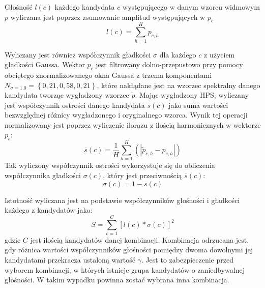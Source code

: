 \documentclass[12pt,a4paper,twoside]{mwart}
\begin{document}
Głośność $l(c)$ każdego kandydata $c$ występującego w danym wzorcu widmowym $p$ wyliczana jest poprzez zsumowanie amplitud występujących w $p_c$
\begin{equation}\label{eq:inharmonicity:loudness}
  l(c) = \sum_{h=1}^H p_{c,h}
\end{equation}

Wyliczany jest również współczynnik gładkości $\sigma$ dla każdego $c$ z użyciem gładkości Gaussa. Wektor $p_c$ jest filtrowany dolno-przepustowo przy pomocy obciętego znormalizowanego okna Gaussa z trzema komponentami $N_{\sigma = 1.0} = \left\{0,21, 0,58, 0,21\right\}$, które nakłądane jest na wzorzec spektralny danego kandydata tworząc wygładzony wzorzec $\widetilde{p}$. Mając wygładzony HPS, wyliczany jest współczynnik ostrości danego kandydata $s(c)$ jako suma wartości bezwzględnej różnicy wygładzonego i oryginalnego wzorca. Wynik tej operacji normalizowany jest poprzez wyliczenie ilorazu z ilością harmonicznych w wektorze $p_c$:
\begin{equation}\label{eq:inharmonicity:sharpness}
  \overline{s}(c) = \frac{1}{H}\sum_{h=1}^H \left(\left|\widetilde{p}_{c,h} - p_{c,h}\right|\right)
\end{equation}
Tak wyliczony współczynnik ostrości wykorzystuje się do obliczenia współczynnika gładkości $\sigma(c)$, który jest przeciwnością $\overline{s}(c)$:
\begin{equation}\label{eq:inharmonicity:smoothnes}
  \sigma(c) = 1 - \overline{s}(c) 
\end{equation}

Istotność wyliczana jest na podstawie współczynników głośności i gładkości każdego z kandydatów jako:
\begin{equation}\label{eq:inharmonicity:salience}
  S = \sum_{c=1}^C\left[l(c)*\sigma(c)\right]^2
\end{equation}
gdzie $C$ jest ilością kandydatów danej kombinacji. Kombinacja  odrzucana jest, gdy różnica wartości współczynników głośności pomiędzy dwoma dowolnymi jej kandydatami przekracza ustaloną wartość $\gamma$. Jest to zabezpieczenie przed wyborem kombinacji, w których istnieje grupa kandydatów o zaniedbywalnej głośności. W takim wypadku powinna zostać wybrana inna kombinacja.
\end{document}
